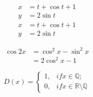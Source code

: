 \documentclass{article} %
\begin{document}
	\begin{align}
		x &=t+\cos t+1\\
		y &=2 \sin t
	\end{align}
	\begin{align*}
	x &=t+\cos t+1\\
	y &=2 \sin t
	\end{align*}
	
	\begin{equation}
	\begin{split}
	\cos 2x &=\cos^2 x- \sin^2 x\\
	&=2\cos^2 x-1
	\end{split}
	\end{equation}		
	
	\begin{equation}
	D(x)=\begin{cases}
	1,& if  x \in \mathbb{Q};\\
	0,& if  x \in \mathbb{R} \setminus \mathbb{Q}
	\end{cases}
	\end{equation}
	
	
	
	
	
	
	
	
	
	
	
	
	
	
	
	
	
	
	
	
	
	
	
	
	
	
	
	
	
	
	
	
	
\end{document}
